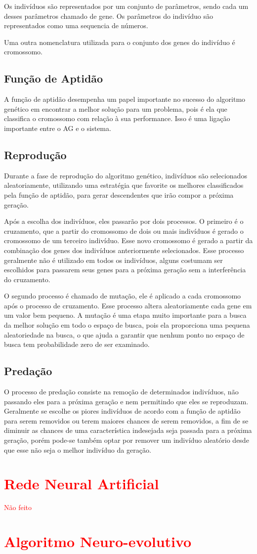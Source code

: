 Os indivíduos são representados por um conjunto de parâmetros, sendo cada um desses parâmetros chamado de gene. Os parâmetros do indivíduo são representados como uma sequencia de números. 

Uma outra nomenclatura utilizada para o conjunto dos genes do indivíduo é cromossomo.

\subsection{Função de Aptidão}

A função de aptidão desempenha um papel importante no sucesso do algoritmo genético em encontrar a melhor solução para um problema, pois é ela que classifica o cromossomo com relação à sua performance. Isso é uma ligação importante entre o AG e o sistema.
\cite{Man1996}

\subsection{Reprodução}
Durante a fase de reprodução do algoritmo genético, indivíduos são selecionados aleatoriamente, utilizando uma estratégia que favorite os melhores classificados pela função de aptidão, para gerar descendentes que irão compor a próxima geração.

Após a escolha dos indivíduos, eles passarão por dois processos. O primeiro é o cruzamento, que a partir do cromossomo de dois ou mais indivíduos é gerado o cromossomo de um terceiro indivíduo. Esse novo cromossomo é gerado a partir da combinação dos genes dos indivíduos anteriormente selecionados. Esse processo geralmente não é utilizado em todos os indivíduos, alguns costumam ser escolhidos para passarem seus genes para a próxima geração sem a interferência do cruzamento.

O segundo processo é chamado de mutação, ele é aplicado a cada cromossomo após o processo de cruzamento. Esse processo altera aleatoriamente cada gene em um valor bem pequeno. A mutação é uma etapa muito importante para a busca da melhor solução em todo o espaço de busca, pois ela proporciona uma pequena aleatoriedade na busca, o que ajuda a garantir que nenhum ponto no espaço de busca tem probabilidade zero de ser examinado.
\cite{Beasley1993}

\subsection{Predação}
O processo de predação consiste na remoção de determinados indivíduos, não passando eles para a próxima geração e nem permitindo que eles se reproduzam. Geralmente se escolhe os piores indivíduos de acordo com a função de aptidão para serem removidos ou terem maiores chances de serem removidos, a fim de se diminuir as chances de uma característica indesejada seja passada para a próxima geração, porém pode-se também optar por remover um indivíduo aleatório desde que esse não seja o melhor indivíduo da geração.

\section{\textcolor{red}{Rede Neural Artificial}}

\textcolor{red}{Não feito}

\section{\textcolor{red}{Algoritmo Neuro-evolutivo}}
